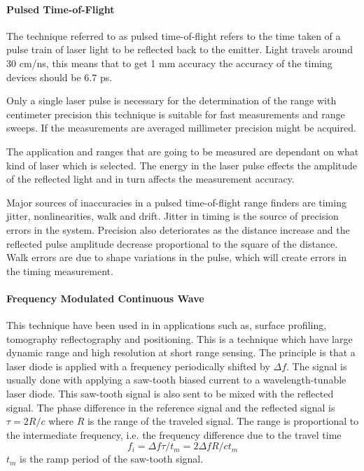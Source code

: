 \paragraph{Pulsed Time-of-Flight}
The technique referred to as pulsed time-of-flight refers to the time taken of a pulse
train of laser light to be reflected back to the emitter. Light travels around 30 cm/ns,
this means that to get 1 mm accuracy the accuracy of the timing devices should be
6.7 ps.

Only a single laser pulse is necessary for the determination of the range with centimeter
precision this technique is suitable for fast measurements and range sweeps. If the
measurements are averaged millimeter precision might be acquired. 

The application and ranges that are going to be measured are dependant on what kind of
laser which is selected. The energy in the laser pulse effects the amplitude of the
reflected light and in turn affects the measurement accuracy.

Major sources of inaccuracies in a pulsed time-of-flight range finders are timing jitter,
nonlinearities, walk and drift. Jitter in timing is the source of precision errors in the
system. Precision also deteriorates as the distance increase and the reflected pulse
amplitude decrease proportional to the square of the distance\cite{pulsed-tof}.
Walk errors are due to shape variations in the pulse, which will create errors in the
timing measurement. 





\paragraph{Frequency Modulated Continuous Wave}
This technique have been used in in applications such as, surface profiling, tomography
reflectography and positioning. This is a technique which have large dynamic range and
high resolution at short range sensing. The principle is that a laser diode is applied
with a frequency periodically shifted by $\Delta f$. The signal is usually done with
applying a saw-tooth biased current to a wavelength-tunable laser diode. This saw-tooth
signal is also sent to be mixed with the reflected signal. The phase difference in the
reference signal and the reflected signal is $\tau = 2 R / c$ where $R$ is the range of
the traveled signal. The range is proportional to the intermediate frequency, i.e. the
frequency difference due to the travel time
\begin{equation}
    f_i = \Delta f \tau /t_m = 2 \Delta f R /c t_m
\end{equation}
$t_m$ is the ramp period of the saw-tooth signal. 

